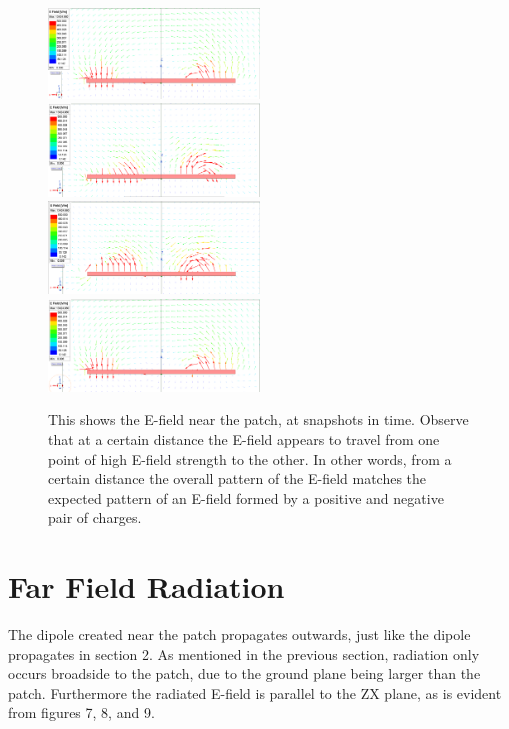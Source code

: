 \documentclass[12pt]{article}
\begin{document}
\newpage
\begin{figure}[ht]
    \centering
    \includegraphics[width=0.5\textwidth]{patch-antenna-NearEfield-t0.png}
    \includegraphics[width=0.5\textwidth]{patch-antenna-NearEfield-t1.png}
    \includegraphics[width=0.5\textwidth]{patch-antenna-NearEfield-t2.png}
    \includegraphics[width=0.5\textwidth]{patch-antenna-NearEfield-t3.png}
    \caption{This shows the E-field near the patch, at snapshots in time. Observe that at a certain distance the E-field appears to travel from one point of high E-field strength to the other. In other words, from a certain distance the overall pattern of the E-field matches the expected pattern of an E-field formed by a positive and negative pair of charges.}
\end{figure}  



\section{Far Field Radiation}

The dipole created near the patch propagates outwards, just like the dipole propagates in section 2. As mentioned in the previous section, radiation only occurs broadside to the patch, due to the ground plane being larger than the patch. Furthermore the radiated E-field is parallel to the ZX plane, as is evident from figures 7, 8, and 9. 
\end{document}
